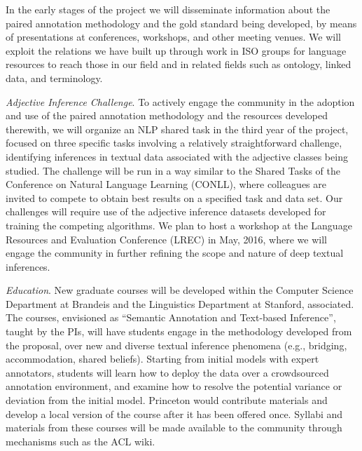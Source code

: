 \documentclass[10pt]{article}
\begin{document}
 
In the early stages of the project we will disseminate information about the paired annotation methodology and the gold standard being developed,   by means of presentations at conferences, workshops, and other meeting venues. We will  exploit the relations we have built up through work in ISO groups for language resources to reach 
those in our field and
in related fields such as ontology, linked data, and terminology.  


{\it Adjective Inference Challenge}. To actively engage the community in the adoption and  use of the paired annotation methodology and the resources developed therewith, we will organize an  NLP shared task in the third year of the project,  focused on three specific tasks involving a relatively straightforward challenge,  identifying inferences in textual data associated with the adjective classes being studied. 
The challenge will be run in a way similar to the Shared Tasks of the Conference on Natural Language Learning (CONLL), where colleagues are invited to compete to obtain best results on a specified task and data set. Our challenges will require use of the adjective inference datasets developed for training the competing algorithms.  We plan to host a workshop at the Language Resources and Evaluation Conference (LREC) in May, 2016, where we will engage the community in further refining the scope and nature of deep textual inferences.

{\it Education}. New graduate courses will be developed within the Computer Science Department at Brandeis and  the Linguistics Department at Stanford, associated. The courses, envisioned as  ``Semantic Annotation and Text-based Inference'', taught by the PIs, will have students engage in the methodology developed from the proposal, over new and diverse textual inference phenomena (e.g., bridging, accommodation, shared beliefs). Starting from initial models with expert annotators, students will learn how to deploy the data over a crowdsourced  annotation environment, and examine how to resolve the potential variance or deviation from the initial model. Princeton would contribute materials and  develop a local version of the course after it has been 
offered  once.
Syllabi and materials from these courses will be made available to the community through mechanisms such as the ACL wiki.
 
\end{document}
